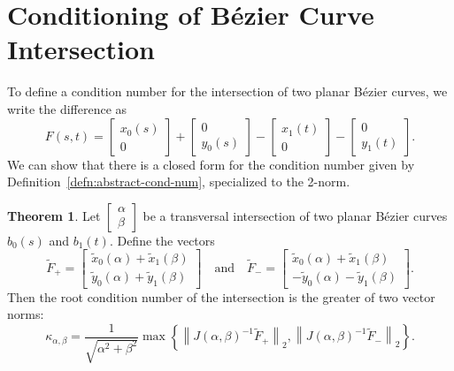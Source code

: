 \documentclass[3p, authoryear, square]{elsarticle}
\theoremstyle{definition}
\newtheorem{theorem}{Theorem}[section]
\begin{document}
\section{Conditioning of B\'{e}zier Curve Intersection}

To define a condition number for the intersection of two planar B\'{e}zier
curves, we write the difference as
\begin{equation}
F(s, t) = \left[ \begin{array}{c} x_0(s) \\ 0 \end{array}\right] +
  \left[ \begin{array}{c} 0 \\ y_0(s) \end{array}\right] -
  \left[ \begin{array}{c} x_1(t) \\ 0 \end{array}\right] -
  \left[ \begin{array}{c} 0 \\ y_1(t) \end{array}\right].
\end{equation}
We can show that there is a closed form for the condition number given
by Definition~\ref{defn:abstract-cond-num}, specialized to the
2-norm.

\begin{theorem}
Let \(\left[\begin{array}{c} \alpha \\ \beta
\end{array}\right]\) be a transversal intersection of two planar
B\'{e}zier curves \(b_0(s)\) and \(b_1(t)\). Define the vectors
\begin{equation}
\widetilde{F}_{+} = \left[ \begin{array}{c}
  \widetilde{x}_0(\alpha) + \widetilde{x}_1(\beta) \\
  \widetilde{y}_0(\alpha) + \widetilde{y}_1(\beta) \end{array}\right] \quad
\text{and} \quad
\widetilde{F}_{-} = \left[ \begin{array}{c}
  \widetilde{x}_0(\alpha) + \widetilde{x}_1(\beta) \\
  -\widetilde{y}_0(\alpha) - \widetilde{y}_1(\beta)\end{array}\right].
\end{equation}
Then the root condition number of the intersection is the
greater of two vector norms:
\begin{equation}
\kappa_{\alpha, \beta} = \frac{1}{\sqrt{\alpha^2 + \beta^2}} \max \left\{
\left \lVert J\left(\alpha, \beta\right)^{-1} \widetilde{F}_{+}\right \rVert_2,
\left \lVert J\left(\alpha, \beta\right)^{-1} \widetilde{F}_{-}\right \rVert_2
\right\}.
\end{equation}
\end{theorem}
\end{document}
